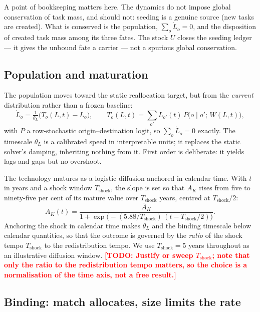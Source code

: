 \documentclass[12pt, a4paper]{article}
\newcommand{\todo}[1]{\textcolor{red}{\textbf{[TODO: #1]}}}
\begin{document}
A point of bookkeeping matters here. The dynamics do not impose global
conservation of task mass, and should not: seeding is a genuine source
(new tasks are created). What is conserved is the population,
$\sum_o\dot L_o = 0$, and the disposition of created task mass among its
three fates. The stock $U$ closes the seeding ledger --- it gives the
unbound fate a carrier --- not a spurious global conservation.

\subsection{Population and maturation}

The population moves toward the static reallocation target, but from the
\emph{current} distribution rather than a frozen baseline:
\begin{equation}
\dot L_o = \tfrac{1}{\theta_L}\big(T_o(L,t) - L_o\big),
\qquad
T_o(L,t) = \sum_{o'} L_{o'}(t)\,P\big(o\mid o';\,W(L,t)\big),
\label{eq:pop}
\end{equation}
with $P$ a row-stochastic origin--destination logit, so $\sum_o\dot L_o=0$
exactly. The timescale $\theta_L$ is a calibrated speed in interpretable
units; it replaces the static solver's damping, inheriting nothing from
it. First order is deliberate: it yields lags and gaps but no overshoot.

The technology matures as a logistic diffusion anchored in calendar time.
With $t$ in years and a shock window $T_{\text{shock}}$, the slope is set
so that $A_K$ rises from five to ninety-five per cent of its mature value
over $T_{\text{shock}}$ years, centred at $T_{\text{shock}}/2$:
\begin{equation}
A_K(t) = \frac{\bar A_K}{1 + \exp\!\big(-(5.88/T_{\text{shock}})\,(t - T_{\text{shock}}/2)\big)}.
\label{eq:maturation}
\end{equation}
Anchoring the shock in calendar time makes $\theta_L$ and the binding
timescale below calendar quantities, so that the outcome is governed by
the \emph{ratio} of the shock tempo $T_{\text{shock}}$ to the
redistribution tempo. We use $T_{\text{shock}}=5$ years throughout as an
illustrative diffusion window. \todo{Justify or sweep $T_{\text{shock}}$;
note that only the ratio to the redistribution tempo matters, so the
choice is a normalisation of the time axis, not a free result.}

\subsection{Binding: match allocates, size limits the rate}
\label{sec:binding}
\end{document}
